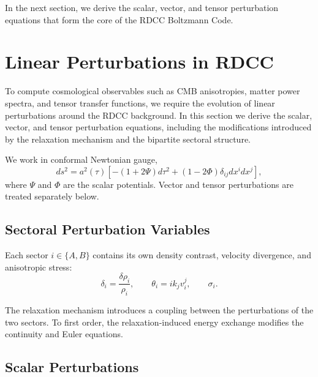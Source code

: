 \documentclass[11pt,a4paper]{article}
\begin{document}
In the next section, we derive the scalar, vector, and tensor perturbation equations that form the core of the RDCC Boltzmann Code.
\section{Linear Perturbations in RDCC}

To compute cosmological observables such as CMB anisotropies, matter power spectra, and tensor transfer functions, we require the evolution of linear perturbations around the RDCC background. In this section we derive the scalar, vector, and tensor perturbation equations, including the modifications introduced by the relaxation mechanism and the bipartite sectoral structure.

We work in conformal Newtonian gauge,
\begin{equation}
ds^2 = a^2(\tau)\left[-(1+2\Psi)d\tau^2 + (1-2\Phi)\delta_{ij}dx^i dx^j\right],
\end{equation}
where $\Psi$ and $\Phi$ are the scalar potentials. Vector and tensor perturbations are treated separately below.

\subsection{Sectoral Perturbation Variables}

Each sector $i \in \{A,B\}$ contains its own density contrast, velocity divergence, and anisotropic stress:
\begin{equation}
\delta_i = \frac{\delta\rho_i}{\rho_i}, \qquad
\theta_i = ik_j v^j_i, \qquad
\sigma_i.
\end{equation}

The relaxation mechanism introduces a coupling between the perturbations of the two sectors. To first order, the relaxation-induced energy exchange modifies the continuity and Euler equations.

\subsection{Scalar Perturbations}
\end{document}
